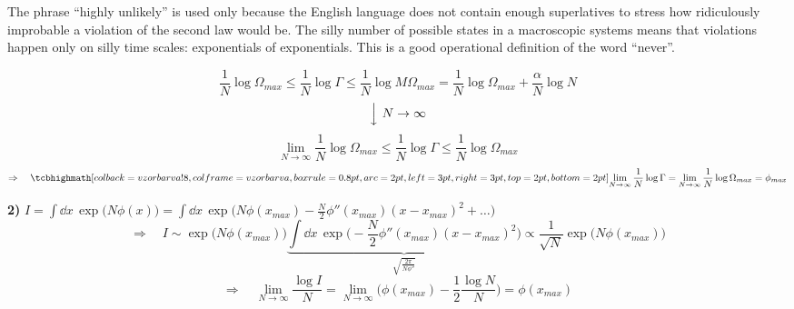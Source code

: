 \begin{center}
\begin{minipage}{0.9\textwidth}
\small The phrase ``highly unlikely'' is used only because the English language does not contain enough superlatives to stress how ridiculously improbable a violation of the second law would be. The silly number of possible states in a macroscopic systems means that violations happen only on silly time scales: exponentials of exponentials. This is a good operational definition of the word ``never''.
\end{minipage}
\end{center}

{\color{NavyBlue}
\[
  \frac1N\log\Omega_{max} \leq \frac1N\log\Gamma \leq \frac1N\log M\Omega_{max} = \frac1N\log\Omega_{max} + \frac{\alpha}{N}\log N
\]
\[
  \Big\downarrow\ N\to\infty
\]
\[
  \lim_{N\to\infty}\frac1N\log\Omega_{max} \leq \frac1N\log\Gamma \leq \frac1N\log\Omega_{max}
\]
\[
  \Rightarrow\quad \vzorec{\lim_{N\to\infty}\frac1N\log\Gamma = \lim_{N\to\infty}\frac1N\log\Omega_{max} = \phi_{max}}
\]

\textbf{2)} \quad $I = \displaystyle\int\dd x\,\exp\big(N\phi(x)\big) = \int\dd x\,\exp\Big(N\phi(x_{max}) - \frac{N}{2}\phi''(x_{max})(x - x_{max})^2 + \dots\Big)$
\[
  \Rightarrow\quad I\sim\exp\big(N\phi(x_{max})\big)
  \underbrace{\int\dd x\,\exp\Big(-\frac{N}{2}\phi''(x_{max})(x - x_{max})^2\Big)}_{\sqrt{\frac{2\pi}{N\phi''}}}
  \propto\frac{1}{\sqrt N}\exp\big(N\phi(x_{max})\big)
\]
\[
  \Rightarrow\quad \lim_{N\to\infty}\frac{\log I}{N} = \lim_{N\to\infty}\Big(\phi(x_{max}) - \frac12\frac{\log N}{N}\Big) = \phi(x_{max})
\]
}

